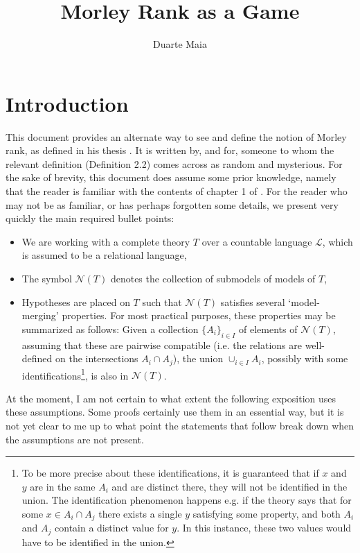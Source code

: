 \documentclass{article}
\title{Morley Rank as a Game}
\author{Duarte Maia}
\theoremstyle{nonumberplain}
\newcommand{\Lang}{\mathcal{L}}
\newcommand{\calN}{\mathcal{N}}
\begin{document}
\maketitle


\section{Introduction}

This document provides an alternate way to see and define the notion of Morley rank, as defined in his thesis \cite{morley}. It is written by, and for, someone to whom the relevant definition (Definition 2.2) comes across as random and mysterious. For the sake of brevity, this document does assume some prior knowledge, namely that the reader is familiar with the contents of chapter 1 of \cite{morley}. For the reader who may not be as familiar, or has perhaps forgotten some details, we present very quickly the main required bullet points:
\begin{itemize}
\item We are working with a complete theory $T$ over a countable language $\Lang$, which is assumed to be a relational language,
\item The symbol $\calN(T)$ denotes the collection of submodels of models of $T$,
\item Hypotheses are placed on $T$ such that $\calN(T)$ satisfies several `model-merging' properties. For most practical purposes, these properties may be summarized as follows: Given a collection $\{A_i\}_{i \in I}$ of elements of $\calN(T)$, assuming that these are pairwise compatible (i.e. the relations are well-defined on the intersections $A_i \cap A_j$), the union $\cup_{i \in I} A_i$, possibly with some identifications\footnote{To be more precise about these identifications, it is guaranteed that if $x$ and $y$ are in the same $A_i$ and are distinct there, they will not be identified in the union. The identification phenomenon happens e.g. if the theory says that for some $x \in A_i \cap A_j$ there exists a single $y$ satisfying some property, and both $A_i$ and $A_j$ contain a distinct value for $y$. In this instance, these two values would have to be identified in the union.}, is also in $\calN(T)$.
\end{itemize}

At the moment, I am not certain to what extent the following exposition uses these assumptions. Some proofs certainly use them in an essential way, but it is not yet clear to me up to what point the statements that follow break down when the assumptions are not present.
\end{document}
